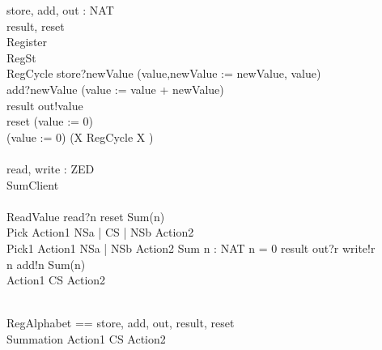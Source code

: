 
\begin{zed}
\end{zed}


\begin{circus}
\circchannel store, add, out : NAT\\
\circchannel result, reset\\

\circprocess Register \circdef\\
	\circbegin \circstate RegSt \\
	RegCycle \circdef store?newValue \then (value,newValue := newValue, value)\\
	\extchoice add?newValue \then (value := value + newValue)\\
	\extchoice result \then out!value \then \Skip\\
	\extchoice reset \then (value := 0)\\
\circspot (value := 0) \circseq (\circmu X \circspot RegCycle \circseq X )\\
	\circend\\

\circchannel read, write : ZED\\
\circprocess SumClient \circdef\\
	\circbegin\\
	ReadValue \circdef read?n \then reset \then Sum(n)\\
	Pick \circdef Action1 \lpar NSa | CS | NSb \rpar Action2\\
	Pick1 \circdef Action1 \linter NSa | NSb \rinter Action2 
	Sum \circdef n : NAT \circspot \lcircguard n = 0 \rcircguard \circguard result \then out?r \then write!r \then \Skip\\
	\extchoice \lcircguard n  \rcircguard \circguard add!n \then Sum(n)\\
	\circspot Action1 \lpar CS \rpar Action2\\
	\circend\\
\end{circus}
\begin{circus}
\circchannelset RegAlphabet == \lchanset store, add, out, result, reset \rchanset\\
\circprocess Summation \circdef Action1 \lpar CS \rpar Action2
\end{circus}

